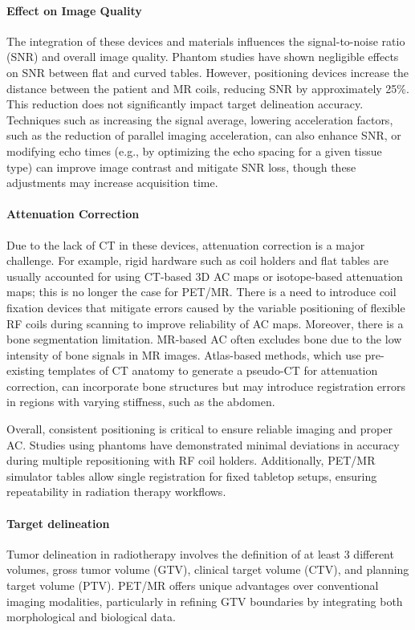 \documentclass[11pt]{article} %
\begin{document}
\begin{multicols}{2}
\paragraph{Effect on Image Quality}
The integration of these devices and materials influences the signal-to-noise ratio (SNR) and overall image quality. Phantom studies have shown negligible effects on SNR between flat and curved tables. However, positioning devices increase the distance between the patient and MR coils, reducing SNR by approximately 25\%. This reduction does not significantly impact target delineation accuracy. Techniques such as increasing the signal average, lowering acceleration factors, such as the reduction of parallel imaging acceleration, can also enhance SNR, or modifying echo times (e.g., by optimizing the echo spacing for a given tissue type) can improve image contrast and mitigate SNR loss, though these adjustments may increase acquisition time. \cite{yan2024,Rostami2024}

\paragraph{Attenuation Correction}
Due to the lack of CT in these devices, attenuation correction is a major challenge. For example, rigid hardware such as coil holders and flat tables are usually accounted for using CT-based 3D AC maps or isotope-based attenuation maps; this is no longer the case for PET/MR. There is a need to introduce coil fixation devices that mitigate errors caused by the variable positioning of flexible RF coils during scanning to improve reliability of AC maps. Moreover, there is a bone segmentation limitation. MR-based AC often excludes bone due to the low intensity of bone signals in MR images. Atlas-based methods, which use pre-existing templates of CT anatomy to generate a pseudo-CT for attenuation correction, can incorporate bone structures but may introduce registration errors in regions with varying stiffness, such as the abdomen.

Overall, consistent positioning is critical to ensure reliable imaging and proper AC. Studies using phantoms have demonstrated minimal deviations in accuracy during multiple repositioning with RF coil holders. Additionally, PET/MR simulator tables allow single registration for fixed tabletop setups, ensuring repeatability in radiation therapy workflows.

\paragraph{Target delineation}
Tumor delineation in radiotherapy involves the definition of at least 3 different volumes, gross tumor volume (GTV), clinical target volume (CTV), and planning target volume (PTV). PET/MR offers unique advantages over conventional imaging modalities, particularly in refining GTV boundaries by integrating both morphological and biological data.



\end{multicols}
\end{document}
